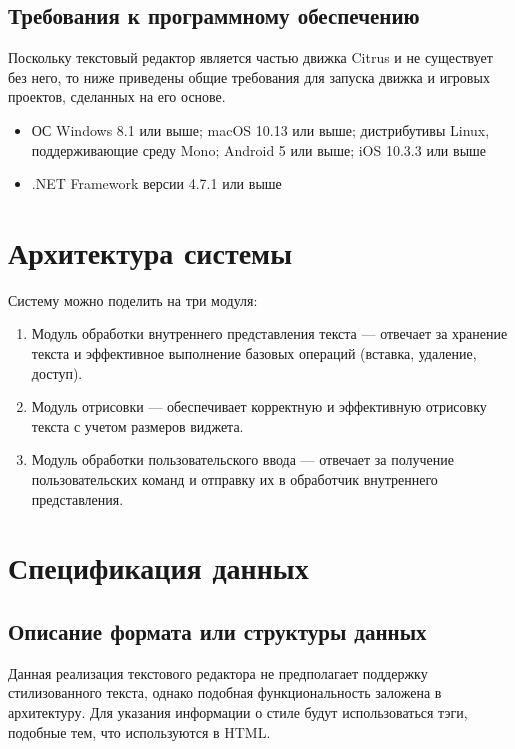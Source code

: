 \documentclass{fefu}
\begin{document}
		\subsection{Требования к программному обеспечению}
			\par Поскольку текстовый редактор является частью движка Citrus и не существует 
			без него, то ниже приведены общие требования для запуска движка и игровых проектов,
			сделанных на его основе.
			\begin{itemize}
				\item ОС Windows 8.1 или выше; macOS 10.13 или выше; дистрибутивы 
				Linux, поддерживающие среду Mono; Android 5 или выше; iOS 10.3.3 или выше
				\item .NET Framework версии 4.7.1 или выше
			\end{itemize}
	\section{Архитектура системы}
		\par Систему можно поделить на три модуля:
		\begin{enumerate}
			\item Модуль обработки внутреннего представления текста --- отвечает за хранение
			текста и эффективное выполнение базовых операций (вставка, удаление, доступ).
			\item Модуль отрисовки --- обеспечивает корректную и эффективную отрисовку текста
			с учетом размеров виджета.
			\item Модуль обработки пользовательского ввода --- отвечает за получение
			пользовательских команд и отправку их в обработчик внутреннего представления.
		\end{enumerate}
	\section{Спецификация данных}
		\subsection{Описание формата или структуры данных}
			\par Данная реализация текстового редактора не предполагает поддержку
			стилизованного текста, однако подобная функциональность заложена в архитектуру.
			Для указания информации о стиле будут использоваться тэги, подобные тем, что
			используются в HTML.
\end{document}
